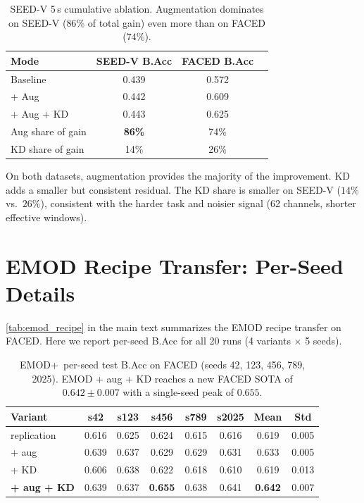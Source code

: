 \begin{table}[!h]
\caption{SEED-V 5\,s cumulative ablation. Augmentation dominates on SEED-V ($86\%$ of total gain) even more than on FACED ($74\%$).}
\small
\centering
\begin{tabular}{lccc}
\toprule
Mode & SEED-V B.Acc & FACED B.Acc & \\
\midrule
Baseline & 0.439 & 0.572 & \\
+ Aug & 0.442 & 0.609 & \\
+ Aug + KD & 0.443 & 0.625 & \\
\midrule
Aug share of gain & \textbf{86\%} & 74\% & \\
KD share of gain & 14\% & 26\% & \\
\bottomrule
\end{tabular}
\label{tab:supp_seedv_decomp}
\end{table}

On both datasets, augmentation provides the majority of the improvement. KD adds a smaller but consistent residual. The KD share is smaller on SEED-V ($14\%$ vs.\ $26\%$), consistent with the harder task and noisier signal (62 channels, shorter effective windows).

\section{EMOD Recipe Transfer: Per-Seed Details}
\label{sec:supp_emod_details}

\cref{tab:emod_recipe} in the main text summarizes the EMOD recipe transfer on FACED. Here we report per-seed B.Acc for all 20 runs (4 variants $\times$ 5 seeds).

\begin{table}[!h]
\caption{EMOD+\ours\ per-seed test B.Acc on FACED (seeds 42, 123, 456, 789, 2025). EMOD + aug + KD reaches a new FACED SOTA of $0.642 \pm 0.007$ with a single-seed peak of $0.655$.}
\small
\centering
\begin{tabular}{lccccccc}
\toprule
Variant & s42 & s123 & s456 & s789 & s2025 & Mean & Std \\
\midrule
replication & 0.616 & 0.625 & 0.624 & 0.615 & 0.616 & 0.619 & 0.005 \\
\quad + aug & 0.639 & 0.637 & 0.629 & 0.629 & 0.631 & 0.633 & 0.005 \\
\quad + KD & 0.606 & 0.638 & 0.622 & 0.618 & 0.610 & 0.619 & 0.013 \\
\rowcolor{blond}
\quad \textbf{+ aug + KD} & 0.639 & 0.637 & \textbf{0.655} & 0.638 & 0.641 & \textbf{0.642} & 0.007 \\
\bottomrule
\end{tabular}
\label{tab:supp_emod_per_seed}
\end{table}

